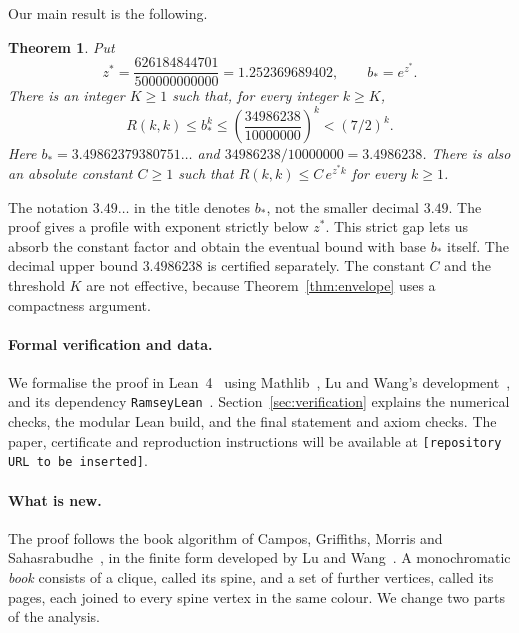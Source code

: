 \documentclass[11pt]{article}
\newtheorem{theorem}{Theorem}[section]
\theoremstyle{definition}
\theoremstyle{remark}
\newcommand{\repository}{\texttt{[repository URL to be inserted]}}
\begin{document}
Our main result is the following.

\begin{theorem}\label{thm:main}
Put
\[
z^*=\frac{626184844701}{500000000000}=1.252369689402,\qquad b_*=e^{z^*}.
\]
There is an integer $K\ge1$ such that, for every integer $k\ge K$,
\[
R(k,k)\le b_*^k\le
\left(\frac{34986238}{10000000}\right)^k<(7/2)^k.
\]
Here $b_*=3.49862379380751\ldots$ and $34986238/10000000=3.4986238$.
There is also an absolute constant $C\ge1$ such that $R(k,k)\le C\,e^{z^*k}$ for every $k\ge1$.
\end{theorem}

The notation $3.49\ldots$ in the title denotes $b_*$, not the smaller decimal $3.49$.
The proof gives a profile with exponent strictly below $z^*$. This strict gap lets us absorb the constant factor
and obtain the eventual bound with base $b_*$ itself. The decimal upper bound $3.4986238$ is certified separately.
The constant $C$ and the threshold $K$ are not effective, because
Theorem~\ref{thm:envelope} uses a compactness argument.

\paragraph{Formal verification and data.} We formalise the proof in Lean~4~\cite{Lean4} using
Mathlib~\cite{Mathlib}, Lu and Wang's development~\cite{LWcode}, and its dependency
\texttt{RamseyLean}~\cite{RamseyLean}. Section~\ref{sec:verification} explains the numerical checks, the modular
Lean build, and the final statement and axiom checks. The paper, certificate and reproduction instructions will
be available at \repository.

\paragraph{What is new.} The proof follows the book algorithm of Campos, Griffiths, Morris and
Sahasrabudhe~\cite{CGMS}, in the finite form developed by Lu and Wang~\cite{LW}. A monochromatic \emph{book}
consists of a clique, called its spine, and a set of further vertices, called its pages, each joined to every
spine vertex in the same colour. We change two parts of the analysis.
\end{document}
